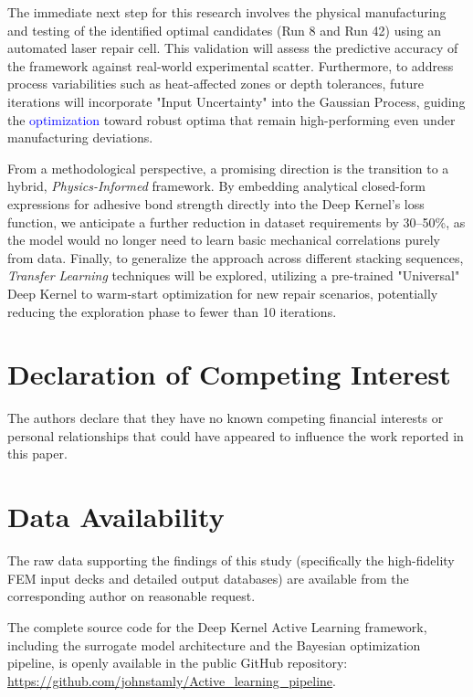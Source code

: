 \documentclass[
  preprint,
  12pt,
  a4paper
]{elsarticle}
\newcommand{\new}[1]{\textcolor{blue}{#1}}
\begin{document}
The immediate next step for this research involves the physical manufacturing and testing of the identified optimal candidates (Run 8 and Run 42) using an automated laser repair cell. This validation will assess the predictive accuracy of the framework against real-world experimental scatter. Furthermore, to address process variabilities such as heat-affected zones or depth tolerances, future iterations will incorporate "Input Uncertainty" into the Gaussian Process, guiding the \new{optimization} toward robust optima that remain high-performing even under manufacturing deviations.

From a methodological perspective, a promising direction is the transition to a hybrid, \textit{Physics-Informed} framework. By embedding analytical closed-form expressions for adhesive bond strength \cite{psarras2024design} directly into the Deep Kernel's loss function, we anticipate a further reduction in dataset requirements by 30--50\%, as the model would no longer need to learn basic mechanical correlations purely from data. Finally, to generalize the approach across different stacking sequences, \textit{Transfer Learning} techniques will be explored, utilizing a pre-trained "Universal" Deep Kernel to warm-start optimization for new repair scenarios, potentially reducing the exploration phase to fewer than 10 iterations.





\section*{Declaration of Competing Interest}
The authors declare that they have no known competing financial interests or personal relationships that could have appeared to influence the work reported in this paper.

\section*{Data Availability}
The raw data supporting the findings of this study (specifically the high-fidelity FEM input decks and detailed output databases) are available from the corresponding author on reasonable request. 

The complete source code for the Deep Kernel Active Learning framework, including the surrogate model architecture and the Bayesian optimization pipeline, is openly available in the public GitHub repository: \url{https://github.com/johnstamly/Active_learning_pipeline}.
\end{document}
